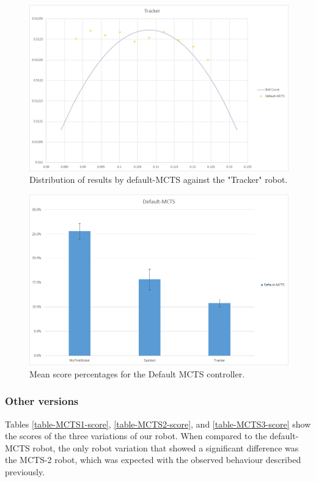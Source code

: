 \begin{figure}[htp]
\centerline{\includegraphics[width=\columnwidth]{Images/TrackerDistribution}}
\caption{Distribution of results by default-MCTS against the "Tracker" robot.}
\label{figure--Distribution-Tracker}
\end{figure}

\begin{figure}[htp]
\centerline{\includegraphics[width=\columnwidth]{Images/BarGraph}}
\caption{Mean score percentages for the Default MCTS controller.}
\label{figure-BarGraph}
\end{figure}

\subsubsection{Other versions}
Tables \ref{table-MCTS1-score}, \ref{table-MCTS2-score}, and \ref{table-MCTS3-score} show the scores of the three variations of our robot. When compared to the default-MCTS robot, the only robot variation that showed a significant difference was the MCTS-2 robot, which was expected with the observed behaviour described previously.


